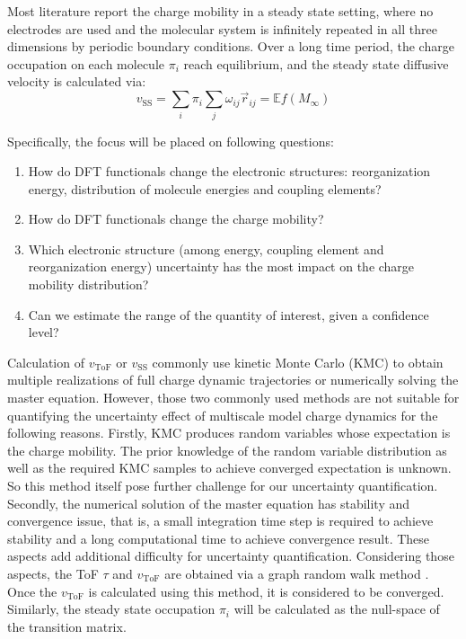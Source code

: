 \documentclass[letterpaper,12pt]{article}
\begin{document}
Most literature report the charge mobility in a steady state setting, where no electrodes are used and the molecular system is infinitely repeated in all three dimensions by periodic boundary conditions. 
Over a long time period, the charge occupation on each molecule $\pi_i$ reach equilibrium, and the steady state diffusive velocity is calculated via:
\begin{equation}
    v_\text{SS} = \sum_i \pi_i \sum_j \omega_{ij} \vec{r}_{ij} = \mathbb{E}f(M_{\infty})
\end{equation} 

Specifically, the focus will be placed on following questions: 
\begin{enumerate}
    \item How do DFT functionals change the electronic structures: reorganization energy, distribution of molecule energies and coupling elements? 
    \item How do DFT functionals change the charge mobility?
    \item Which electronic structure (among energy, coupling element and reorganization energy) uncertainty has the most impact on the charge mobility distribution?
    \item Can we estimate the range of the quantity of interest, given a confidence level?
\end{enumerate}


Calculation of $v_\text{ToF}$ or $v_\text{SS}$ commonly use kinetic Monte Carlo (KMC) to obtain multiple realizations of full charge dynamic trajectories 
or numerically solving the master equation. 
However, those two commonly used methods are not suitable for quantifying the uncertainty effect of multiscale model charge dynamics for the following reasons. 
Firstly, KMC produces random variables whose expectation is the charge mobility. The prior knowledge of the random variable distribution as well as the required KMC samples to achieve converged expectation is unknown. So this method itself pose further challenge for our uncertainty quantification. 
Secondly, the numerical solution of the master equation has stability and convergence issue, that is, a small integration time step is required to achieve stability and a long computational time to achieve convergence result. These aspects add additional difficulty for uncertainty quantification. 
Considering those aspects, the ToF $\tau$ and $v_\text{ToF}$ are obtained via a graph random walk method
\cite{chen_graph_2024}. Once the $v_\text{ToF}$ is calculated using this method, it is considered to be converged. 
Similarly, the steady state occupation $\pi_i$ will be calculated as the null-space of the transition matrix. 
\end{document}
